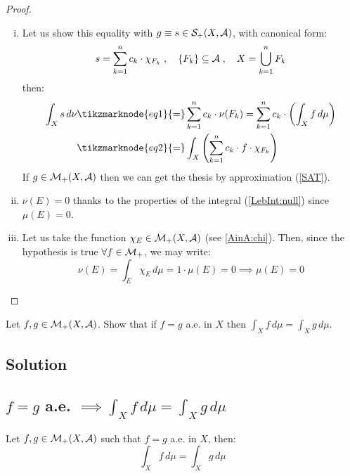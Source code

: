 \begin{proof}
    \hspace*{\fill} %
    \begin{enumerate}[i)]
        \item Let us show this equality with $g\equiv s \in \mathcal{S}_+(X,\mathcal{A})$, with canonical form:
            \[
                s = \sum_{k=1}^n c_k\cdot \chi_{F_k} \;, \quad \{F_k\}\subseteq\mathcal{A} \;, \quad X = \bigcup_{k=1}^n F_k   
            \]
        then:
            \begin{align*}
                \int_X s \, d\nu & \tikzmarknode{eq1}{=} \sum_{k=1}^n c_k \cdot \nu(F_k) = \sum_{k=1}^n c_k \cdot \left( \int_X f \, d\mu \right) \\
                & \tikzmarknode{eq2}{=} \int_X \left( \sum_{k=1}^n c_k \cdot f \cdot \chi_{F_k} \right)
            \end{align*} 
            If $g\in\mathcal{M}_+(X,\mathcal{A})$ then we can get the thesis by approximation (\ref{SAT}).
        \item $\nu(E)=0$ thanks to the properties of the integral (\ref{LebInt:null}) since $\mu(E)=0$.
        \item Let us take the function $\chi_E\in\mathcal{M}_+(X,\mathcal{A})$ (see \ref{AinA:chi}). Then, since the hypothesis is true $\forall f \in \mathcal{M}_+$, we may write:
            \[
                \nu(E) = \int_E \chi_E \, d\mu = 1 \cdot \mu(E) = 0 \implies \mu(E)=0
            \]
    \end{enumerate}
\end{proof}


\question
Let $f, g \in \mathcal{M}_+(X, \mathcal{A})$. Show that if $f = g$ a.e. in $X$ then $\int_X f \, d\mu = \int_X g\, d\mu$.

\subsection*{Solution}

\subsection{\texorpdfstring{$f = g$ a.e. $\implies \int_X f \, d\mu = \int_X g\, d\mu$}{if f and g are equal almost everywhere then their integrals are equal}} \label{fgpos:SfSg}
Let $f,g\in\mathcal{M}_+(X,\mathcal{A})$ such that $f=g$ a.e. in $X$, then: 
\[
    \int_X f \, d\mu = \int_X g\, d\mu
\]

